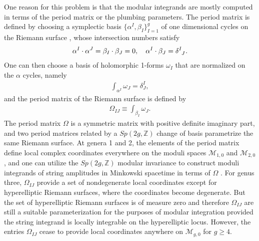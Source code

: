 \documentclass[12pt]{article}
\def\ie{\begin{equation}\begin{aligned}}
\def\fe{\end{aligned}\end{equation}}
\numberwithin{equation}{section}
\begin{document}
One reason for this problem is that the modular integrands are mostly computed in terms of the period matrix or the plumbing parameters. The period matrix is defined by choosing a symplectic basis $\{\alpha^I, \beta_I\}_{I=1}^g$ of one dimensional cycles on the Riemann surface \cite{farkas1980riemann,StringNotes}, whose intersection numbers satisfy
\ie
\alpha^I \cdot \alpha^J=\beta_I \cdot \beta_J=0, \quad \alpha^I \cdot \beta_J=\tensor{\delta}{^I_J} .
\fe
One can then choose a basis of holomorphic 1-forms $\omega_I$ that are normalized on the $\alpha$ cycles, namely
\ie
\int_{\alpha^I}\omega_J = \delta^I_J,
\fe
and the period matrix of the Riemann surface is defined by
\ie
\Omega_{IJ} \equiv \int_{\beta_I} \omega_J.
\fe
The period matrix $\Omega$ is a symmetric matrix with positive definite imaginary part, and two period matrices related by a $Sp(2g,\mathbb{Z})$ change of basis parametrize the same Riemann surface. At genera 1 and 2, the elements of the period matrix define local complex coordinates everywhere on the moduli spaces $\mathcal{M}_{1,0}$ and $\mathcal{M}_{2,0}$, and one can utilize the $Sp(2g,\mathbb{Z})$ modular invariance to construct moduli integrands of string amplitudes in Minkowski spacetime in terms of $\Omega$ \cite{Rauch:1959}. For genus three, $\Omega_{IJ}$ provide a set of nondegenerate local coordinates except for hyperelliptic Riemann surfaces, where the coordinates become degenerate. But the set of hyperelliptic Riemann surfaces is of measure zero and therefore $\Omega_{IJ}$ are still a suitable parameterization for the purposes of modular integration provided the string integrand is locally integrable on the hyperelliptic locus. However, the entries $\Omega_{IJ}$ cease to provide local coordinates anywhere on $\mathcal{M}_{g,0}$ for $g\geq 4$.

%
\end{document}
